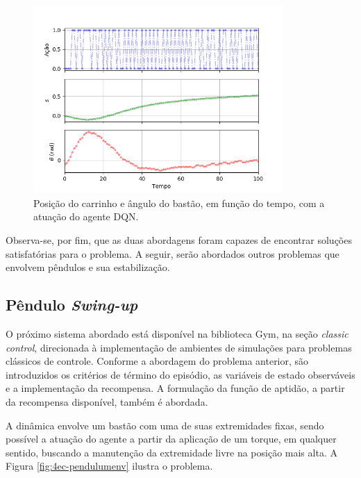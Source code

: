 \begin{figure}[H]
	\centering
	\includegraphics[width=0.85\textwidth]{02_desenvolvimento/04_EC_Fig_CartpoleDQNVarGraf.png}
	\caption{Posição do carrinho e ângulo do bastão, em função do tempo, com a atuação do agente DQN.}
	\label{fig:4ec-cartpoledqnvargraf}
\end{figure}

Observa-se, por fim, que as duas abordagens foram capazes de encontrar soluções satisfatórias para o problema. A seguir, serão abordados outros problemas que envolvem pêndulos e sua estabilização.

\subsection{Pêndulo \textit{Swing-up}}\label{ssec:4ec-pendulum}

O próximo sistema abordado está disponível na biblioteca Gym, na seção \textit{classic control}, direcionada à implementação de ambientes de simulações para problemas clássicos de controle. Conforme a abordagem do problema anterior, são introduzidos os critérios de término do episódio, as variáveis de estado observáveis e a implementação da recompensa. A formulação da função de aptidão, a partir da recompensa disponível, também é abordada.

A dinâmica envolve um bastão com uma de suas extremidades fixas, sendo possível a atuação do agente a partir da aplicação de um torque, em qualquer sentido, buscando a manutenção da extremidade livre na posição mais alta. A Figura \ref{fig:4ec-pendulumenv} ilustra o problema.

